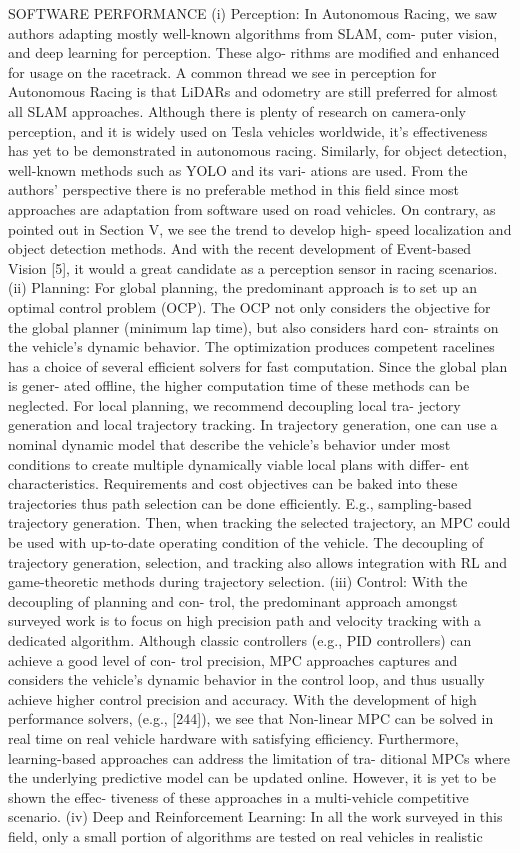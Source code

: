 SOFTWARE PERFORMANCE 
(i) Perception: In Autonomous Racing, we saw authors adapting mostly well-known algorithms from SLAM, com- puter vision, and deep learning for perception. These algo- rithms are modified and enhanced for usage on the racetrack. A common thread we see in perception for Autonomous Racing is that LiDARs and odometry are still preferred for almost all SLAM approaches. Although there is plenty of research on camera-only perception, and it is widely used on Tesla vehicles worldwide, it’s effectiveness has yet to be demonstrated in autonomous racing. Similarly, for object detection, well-known methods such as YOLO and its vari- ations are used. From the authors’ perspective there is no preferable method in this field since most approaches are adaptation from software used on road vehicles. On contrary, as pointed out in Section V, we see the trend to develop high- speed localization and object detection methods. And with the recent development of Event-based Vision [5], it would a great candidate as a perception sensor in racing scenarios. (ii) Planning: For global planning, the predominant approach is to set up an optimal control problem (OCP). The OCP not only considers the objective for the global planner (minimum lap time), but also considers hard con- straints on the vehicle’s dynamic behavior. The optimization produces competent racelines has a choice of several efficient solvers for fast computation. Since the global plan is gener- ated offline, the higher computation time of these methods can be neglected. For local planning, we recommend decoupling local tra- jectory generation and local trajectory tracking. In trajectory generation, one can use a nominal dynamic model that describe the vehicle’s behavior under most conditions to create multiple dynamically viable local plans with differ- ent characteristics. Requirements and cost objectives can be baked into these trajectories thus path selection can be done efficiently. E.g., sampling-based trajectory generation. Then, when tracking the selected trajectory, an MPC could be used with up-to-date operating condition of the vehicle. The decoupling of trajectory generation, selection, and tracking also allows integration with RL and game-theoretic methods during trajectory selection. (iii) Control: With the decoupling of planning and con- trol, the predominant approach amongst surveyed work is to focus on high precision path and velocity tracking with a dedicated algorithm. Although classic controllers (e.g., PID controllers) can achieve a good level of con- trol precision, MPC approaches captures and considers the vehicle’s dynamic behavior in the control loop, and thus usually achieve higher control precision and accuracy. With the development of high performance solvers, (e.g., [244]), we see that Non-linear MPC can be solved in real time on real vehicle hardware with satisfying efficiency. Furthermore, learning-based approaches can address the limitation of tra- ditional MPCs where the underlying predictive model can be updated online. However, it is yet to be shown the effec- tiveness of these approaches in a multi-vehicle competitive scenario. (iv) Deep and Reinforcement Learning: In all the work surveyed in this field, only a small portion of algorithms are tested on real vehicles in realistic 